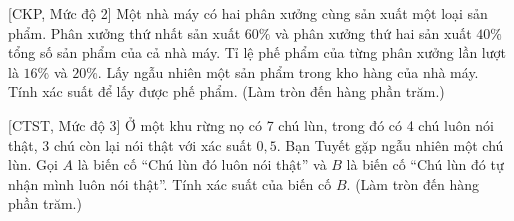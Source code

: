 \begin{bt}%
[CKP, Mức độ 2]%
	Một nhà máy có hai phân xưởng cùng sản xuất một loại sản phẩm. Phân xưởng thứ nhất sản xuất $60 \%$ và phân xưởng thứ hai sản xuất $40 \%$ tổng số sản phẩm của cả nhà máy. Tỉ lệ phế phẩm của từng phân xưởng lần lượt là $16 \%$ và $20 \%$. Lấy ngẫu nhiên một sản phẩm trong kho hàng của nhà máy. Tính xác suất để lấy được phế phẩm.
	(Làm  tròn đến hàng phần trăm.)
\end{bt}

\begin{bt}%
[CTST, Mức độ 3]%
	Ở một khu rừng nọ có 7 chú lùn, trong đó có 4 chú luôn nói thật, 3 chú còn lại nói thật với 
	xác suất $0{,}5$. Bạn Tuyết gặp ngẫu nhiên một chú lùn. Gọi $A$ là biến cố ``Chú lùn đó luôn
	nói thật'' và $B$ là biến cố ``Chú lùn đó tự nhận mình luôn nói thật''. Tính xác suất của  biến cố  $B$. (Làm  tròn đến hàng phần trăm.) 
\end{bt}

